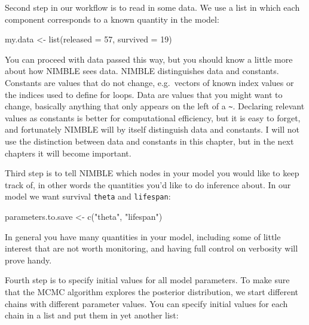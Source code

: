 \documentclass[
  12pt,
]{krantz}
\newenvironment{Shaded}{\begin{snugshade}}{\end{snugshade}}
\newcommand{\AttributeTok}[1]{\textcolor[rgb]{0.77,0.63,0.00}{#1}}
\newcommand{\DecValTok}[1]{\textcolor[rgb]{0.00,0.00,0.81}{#1}}
\newcommand{\FunctionTok}[1]{\textcolor[rgb]{0.00,0.00,0.00}{#1}}
\newcommand{\NormalTok}[1]{#1}
\newcommand{\OtherTok}[1]{\textcolor[rgb]{0.56,0.35,0.01}{#1}}
\newcommand{\StringTok}[1]{\textcolor[rgb]{0.31,0.60,0.02}{#1}}
\begin{document}
Second step in our workflow is to read in some data. We use a list in which each component corresponds to a known quantity in the model:

\begin{Shaded}
\begin{Highlighting}[]
\NormalTok{my.data }\OtherTok{\textless{}{-}} \FunctionTok{list}\NormalTok{(}\AttributeTok{released =} \DecValTok{57}\NormalTok{, }\AttributeTok{survived =} \DecValTok{19}\NormalTok{)}
\end{Highlighting}
\end{Shaded}

You can proceed with data passed this way, but you should know a little more about how NIMBLE sees data. NIMBLE distinguishes data and constants. Constants are values that do not change, e.g.~vectors of known index values or the indices used to define for loops. Data are values that you might want to change, basically anything that only appears on the left of a \texttt{\textasciitilde{}}. Declaring relevant values as constants is better for computational efficiency, but it is easy to forget, and fortunately NIMBLE will by itself distinguish data and constants. I will not use the distinction between data and constants in this chapter, but in the next chapters it will become important.

Third step is to tell NIMBLE which nodes in your model you would like to keep track of, in other words the quantities you'd like to do inference about. In our model we want survival \texttt{theta} and \texttt{lifespan}:

\begin{Shaded}
\begin{Highlighting}[]
\NormalTok{parameters.to.save }\OtherTok{\textless{}{-}} \FunctionTok{c}\NormalTok{(}\StringTok{"theta"}\NormalTok{, }\StringTok{"lifespan"}\NormalTok{)}
\end{Highlighting}
\end{Shaded}

In general you have many quantities in your model, including some of little interest that are not worth monitoring, and having full control on verbosity will prove handy.

Fourth step is to specify initial values for all model parameters. To make sure that the MCMC algorithm explores the posterior distribution, we start different chains with different parameter values. You can specify initial values for each chain in a list and put them in yet another list:
\end{document}
